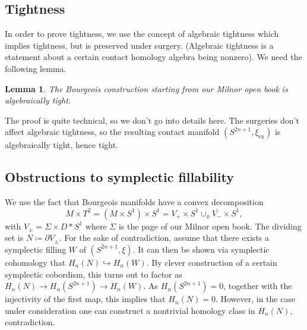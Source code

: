 \documentclass{amsart}
\newtheorem{lemma}{Lemma}
\newtheorem{definition}{Definition}
\begin{document}
\subsection*{Tightness}

In order to prove tightness, we use the concept of algebraic tightness which implies tightness,
but is preserved under surgery.
(Algebraic tightness is a statement about a certain contact homology algebra being nonzero).
We need the following lemma.
\begin{lemma}
    The Bourgeois construction starting from our Milnor open book
    is algebraically tight.
\end{lemma}
The proof is quite technical, so we don't go into details here.
The surgeries don't affect algebraic tightness, so the resulting
contact manifold $(S^{2n+1}, \xi_\mathrm{ex})$ is algebraically tight, hence tight.


\subsection*{Obstructions to symplectic fillability}
We use the fact that Bourgeois manifolds have a convex decomposition
\[
    M \times T^2 = (M \times S^1) \times S^1 = V_+ \times S^1 \cup_\phi \overline{V_-} \times S^1,  
\]
with $V_{\pm} = \Sigma \times D*S^1$ where $\Sigma$ is the page of our Milnor open book.
The dividing set is $N \coloneqq \partial V_{\pm}$.
For the sake of contradiction, assume that there exists a symplectic filling $W$ of $(S^{2n+1}, \xi)$.
It can then be shown via symplectic cohomology that $H_n(N) \hookrightarrow H_n(W)$.
By clever construction of a certain symplectic cobordism, this turns out to factor
as $H_n(N) \to H_n(S^{2n+1}) \to H_n(W)$.
As $H_n(S^{2n+1}) = 0$, together with the injectivity of the first map,
this implies that $H_n(N) = 0$.
However, in the case under consideration one can construct a nontrivial homology class
in $H_n(N)$, contradiction.



\end{document}
